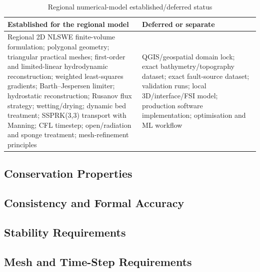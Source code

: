 \begin{table}[htbp]
  \centering
  \small
  \renewcommand{\arraystretch}{1.2}
  \begin{tabular}{
      p{}
      p{}
    }
    \hline
    Established for the regional model
    &
    Deferred or separate
    \\
    \hline
    Regional 2D NLSWE finite-volume formulation; polygonal geometry;
    triangular practical meshes; first-order and limited-linear
    hydrodynamic reconstruction; weighted least-squares gradients;
    Barth--Jespersen limiter; hydrostatic reconstruction; Rusanov flux
    strategy; wetting/drying; dynamic bed treatment; SSPRK(3,3)
    transport with Manning;
    CFL timestep; open/radiation and sponge treatment; mesh-refinement
    principles
    &
    QGIS/geospatial domain lock; exact bathymetry/topography dataset;
    exact fault-source dataset; validation runs; local 3D/interface/FSI
    model; production software implementation; optimisation and ML
    workflow
    \\
    \hline
  \end{tabular}
  \caption{Regional numerical-model established/deferred status}
  \label{tab:res-num-spec-regional-established-deferred}
\end{table}

\subsection{Conservation Properties}
\label{sec:res-num-spec-conservation-properties}


\subsection{Consistency and Formal Accuracy}
\label{sec:res-num-spec-consistency-formal-accuracy}


\subsection{Stability Requirements}
\label{sec:res-num-spec-stability-requirements}


\subsection{Mesh and Time-Step Requirements}
\label{sec:res-num-spec-mesh-time-step-requirements}

